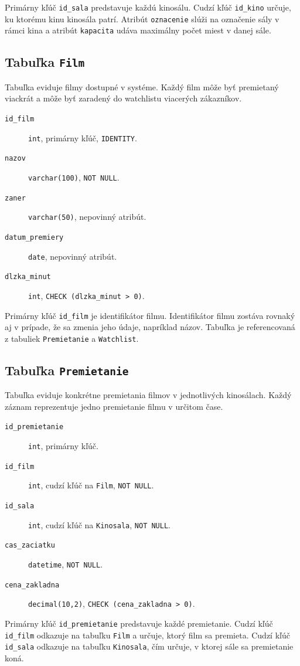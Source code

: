 \documentclass[11pt, a4paper]{article}
\begin{document}
Primárny kľúč \texttt{id\_sala} predstavuje každú kinosálu.
Cudzí kľúč \texttt{id\_kino} určuje, ku ktorému kinu kinosála patrí.
Atribút \texttt{oznacenie} slúži na označenie sály v rámci kina a atribút \texttt{kapacita}
udáva maximálny počet miest v danej sále.

\subsection{Tabuľka \texttt{Film}}
Tabuľka eviduje filmy dostupné v systéme. Každý film môže byť premietaný viackrát a môže byť
zaradený do watchlistu viacerých zákazníkov.

\begin{description}
    \item[\texttt{id\_film}] \texttt{int}, primárny kľúč, \texttt{IDENTITY}.
    \item[\texttt{nazov}] \texttt{varchar(100)}, \texttt{NOT NULL}.
    \item[\texttt{zaner}] \texttt{varchar(50)}, nepovinný atribút.
    \item[\texttt{datum\_premiery}] \texttt{date}, nepovinný atribút.
    \item[\texttt{dlzka\_minut}] \texttt{int}, \texttt{CHECK (dlzka\_minut > 0)}.
\end{description}

Primárny kľúč \texttt{id\_film} je identifikátor filmu.
Identifikátor filmu zostáva rovnaký aj v prípade, že sa zmenia jeho údaje, napríklad názov. Tabuľka je referencovaná z tabuliek \texttt{Premietanie} a \texttt{Watchlist}.

\subsection{Tabuľka \texttt{Premietanie}}
Tabuľka eviduje konkrétne premietania filmov v jednotlivých kinosálach. Každý záznam
reprezentuje jedno premietanie filmu v určitom čase.
\begin{description}
    \item[\texttt{id\_premietanie}] \texttt{int}, primárny kľúč.
    \item[\texttt{id\_film}] \texttt{int}, cudzí kľúč na \texttt{Film}, \texttt{NOT NULL}.
    \item[\texttt{id\_sala}] \texttt{int}, cudzí kľúč na \texttt{Kinosala}, \texttt{NOT NULL}.
    \item[\texttt{cas\_zaciatku}] \texttt{datetime}, \texttt{NOT NULL}.
    \item[\texttt{cena\_zakladna}] \texttt{decimal(10,2)}, \texttt{CHECK (cena\_zakladna > 0)}.
\end{description}
Primárny kľúč \texttt{id\_premietanie} predstavuje každé premietanie.
Cudzí kľúč \texttt{id\_film} odkazuje na tabuľku \texttt{Film} a určuje, ktorý film sa premieta.
Cudzí kľúč \texttt{id\_sala} odkazuje na tabuľku \texttt{Kinosala}, čím určuje, v ktorej sále sa
premietanie koná.
\end{document}
